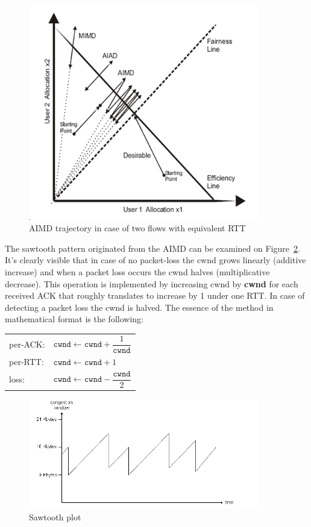 \documentclass[a4paper]{article}
\begin{document}
\begin{figure}[H]
    \centering
    \includegraphics[width=0.9\textwidth]{figures/AIMD-trajectory.png}
    \caption{AIMD trajectory in case of two flows with equivalent RTT }
    \label{fig:AIMD}
\end{figure}

The sawtooth pattern originated from the AIMD can be examined on Figure~\ref{fig:sawtooth}. It's clearly visible that
in case of no packet-loss the cwnd grows linearly (additive increase) and when a packet loss occurs the cwnd halves
(multiplicative decrease). This operation is implemented by increasing cwnd by \textbf{cwnd} for each received ACK that
roughly translates to increase by 1 under one RTT. In case of detecting a packet loss the cwnd is halved. The essence
of the method in mathematical format is the following:

\begin{tabular}{ll}
    per-ACK: & $\texttt{cwnd} \leftarrow \texttt{cwnd} + \dfrac{1}{\texttt{cwnd}}$  \\
    per-RTT: & $\texttt{cwnd} \leftarrow \texttt{cwnd} + 1$                         \\
    loss:    & $\texttt{cwnd} \leftarrow \texttt{cwnd} - \dfrac{\texttt{cwnd}}{2}$  \\
\end{tabular}

\begin{figure}[H]
    \centering
    \includegraphics[width=0.9\textwidth]{figures/sawtooth.png}
    \caption{Sawtooth plot}
    \label{fig:sawtooth}
\end{figure}
\end{document}
